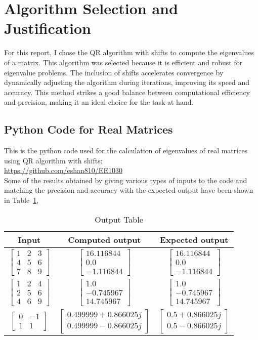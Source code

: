 \documentclass[12pt]{article}
\newcommand{\myvec}[1]{\begin{bmatrix} #1 \end{bmatrix}}
\begin{document}
\section{Algorithm Selection and Justification}
For this report, I chose the QR algorithm with shifts to compute the eigenvalues of a matrix. This algorithm was selected because it is efficient and robust for eigenvalue problems. The inclusion of shifts accelerates convergence by dynamically adjusting the algorithm during iterations, improving its speed and accuracy. This method strikes a good balance between computational efficiency and precision, making it an ideal choice for the task at hand.

\subsection{Python Code for Real Matrices}
This is the python code used for the calculation of eigenvalues of real matrices using QR algorithm with shifts: \\
\url{https://github.com/eshan810/EE1030}\\

Some of the results obtained by giving various types of inputs to the code and matching the precision and accuracy with the expected output have been shown in Table~\ref{Table 1},


\begin{table}[H]
\centering
\begin{tabular}{|c|c|c|}
\hline
\textbf{Input} & \textbf{Computed output} & \textbf{Expected output} \\
\hline
$\myvec{1 &2 &3\\4&5 &6\\7&8&9}$ & $\myvec{16.116844\\ 0.0\\-1.116844}$ & $\myvec{16.116844\\ 0.0\\-1.116844}$ \\ \hline
$\myvec{1&2&4\\2&5&6\\4&6&9}$ & $\myvec{1.0\\ -0.745967\\ 14.745967}$ & $\myvec{1.0\\ -0.745967\\ 14.745967}$ \\ \hline
$\myvec{0&-1\\1&1}$ & $\myvec{0.499999+0.866025j\\0.499999-0.866025j}$ &$\myvec{0.5+0.866025j\\0.5-0.866025j}$\\ \hline
\end{tabular}
\caption{Output Table}
\label{Table 1}
\end{table}
\end{document}
